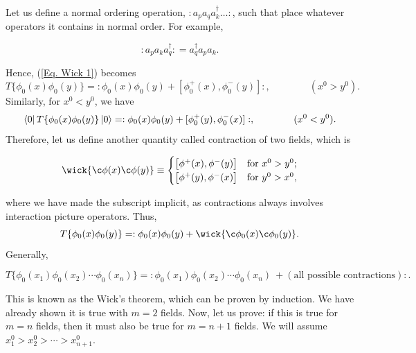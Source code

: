 \documentclass[11pt]{article}
\theoremstyle{definition}
\begin{document}
Let us define a normal ordering operation, $:a_pa_q a_k^\dagger\ldots:$, such that place whatever operators it contains in normal order. For example,
\begin{shaded}
    \begin{equation}
        :a_pa_ka_q^\dagger: = a_q^\dagger a_pa_k.
    \end{equation}
\end{shaded}
Hence, (\ref{Eq. Wick 1}) becomes
\begin{equation}
    T\{\phi_0(x)\phi_0(y)\} = :\phi_0(x)\phi_0(y) + [\phi_0^+(x), \phi_0^-(y)]:, \qquad \qquad (x^0 > y^0).
\end{equation}
Similarly, for $x^0 < y^0$, we have
\begin{equation}
    \bra{0}T\{\phi_0(x)\phi_0(y)\}\ket{0} = :\phi_0(x)\phi_0(y) + [\phi_0^+(y), \phi_0^-(x)]:, \qquad \qquad (x^0 < y^0).
\end{equation}
Therefore, let us define another quantity called contraction of two fields, which is 
\begin{shaded}
    \begin{equation}
    \begin{aligned}
    \wick{\c\phi(x)\c\phi(y)} \equiv 
    \begin{cases} 
        \big[\phi^+(x), \phi^-(y)\big] & \text{for } x^0 > y^0; \\ 
        \big[\phi^+(y), \phi^-(x)\big] & \text{for } y^0 > x^0,
    \end{cases}
\end{aligned}
\end{equation}
\end{shaded}
where we have made the subscript implicit, as contractions always involves interaction picture operators.
Thus,
\begin{equation}
        T\{\phi_0(x)\phi_0(y)\} = :\phi_0(x)\phi_0(y) + \wick{\c\phi_0(x) \c\phi_0(y)}.
\end{equation}
Generally,
\begin{shaded}
    \begin{equation}
        T\{\phi_0(x_1)\phi_0(x_2) \cdots \phi_0(x_n)\} = :\phi_0(x_1)\phi_0(x_2) \cdots \phi_0(x_n)\ + (\text{all possible contractions}):.
    \end{equation}
\end{shaded}
This is known as the Wick's theorem, which can be proven by induction. We have already shown it is true with $m=2$ fields. Now, let us prove: if this is true for $m=n$ fields, then it must also be true for $m=n+1$ fields. We will assume $x_1^0 > x_2^0 > \cdots > x_{n+1}^0$.
\end{document}
